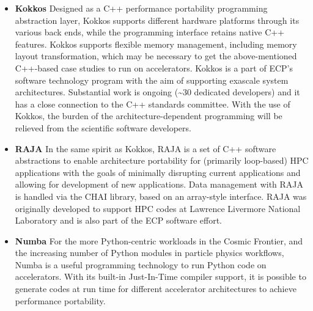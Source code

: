 \begin{itemize}
\begin{itemize}
\item {\bf Kokkos}
Designed as a C++ performance portability programming abstraction
layer, Kokkos supports different hardware platforms through
its various back ends, while the programming interface retains
native C++ features. Kokkos supports flexible memory management,
including memory layout transformation, which may be necessary
to get the above-mentioned C++-based case studies to run on
accelerators. Kokkos is a part of ECP's software technology
program with the aim of supporting exascale system
architectures. Substantial work is ongoing (\textasciitilde 30 dedicated
developers) and it has a close connection to the C++ standards
committee. With the use of Kokkos, the burden of the
architecture-dependent programming will be relieved from the
scientific software developers.

\item {\bf RAJA}
In the same spirit as Kokkos, RAJA is a set of C++ software
abstractions to enable architecture portability for (primarily
loop-based) HPC applications with the goals of minimally
disrupting current applications and allowing for development of
new applications. Data management with RAJA is handled via the
CHAI library, based on an array-style interface. RAJA was
originally developed to support HPC codes at Lawrence Livermore
National Laboratory and is also part of the ECP software effort.

\item {\bf Numba}
For the more Python-centric workloads in the Cosmic Frontier, and
the increasing number of Python modules in particle physics
workflows, Numba is a useful programming technology to run
Python code on accelerators. With its built-in Just-In-Time
compiler support, it is possible to generate codes at run time
for different accelerator architectures to achieve performance
portability.

\end{itemize}


\end{itemize}

